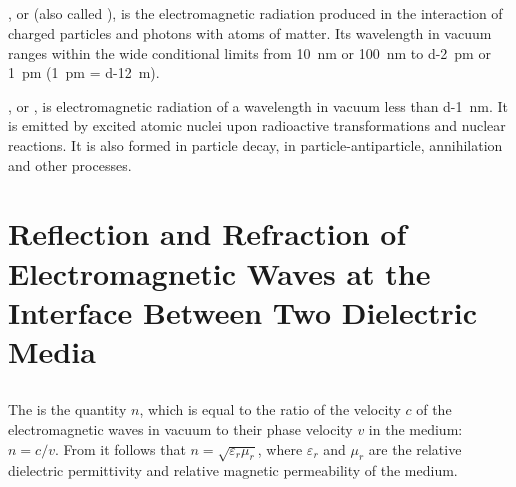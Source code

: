\subsection{}\label{31.4.4} , or  (also called ), is the electromagnetic radiation produced in the interaction of charged
particles and photons  with atoms of matter. Its wavelength in vacuum ranges within the wide conditional limits
from \SI{10}{\nano\meter} or \SI{100}{\nano\meter} to \SI{d-2}{\pico\meter} or \SI{1}{\pico\meter} (\SI{1}{\pico\meter} = \SI{d-12}{\meter}).

, or , is electromagnetic radiation of a wavelength in vacuum less than \SI{d-1}{\nano\meter}. It is emitted by excited atomic nuclei upon radioactive transformations and nuclear reactions. It is also formed in particle decay, in particle-antiparticle, annihilation  and other processes.

\section[Reflection and Refraction]{Reflection and Refraction of Electromagnetic Waves at the Interface Between Two Dielectric Media}
\label{sec-31.5} 




\subsection{}\label{31.5.1} The  is the quantity $n$, which is equal to the ratio of the velocity $c$
of the electromagnetic waves in vacuum to their phase velocity
$v$ in the medium: $n = c/v$. From  it follows that $n = \sqrt{\varepsilon_{r}\mu_{r}}$, where $\varepsilon_{r}$ and $\mu_{r}$ are the relative dielectric permittivity
and relative magnetic permeability of the medium.

